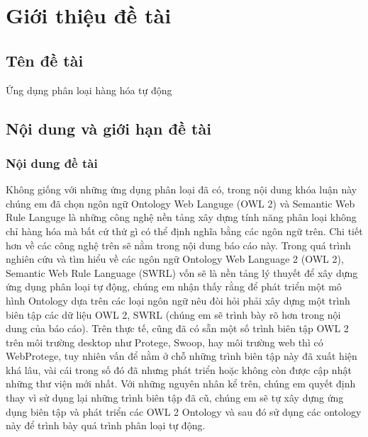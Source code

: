 
\chapter {Giới thiệu đề tài}
\section{Tên đề tài}
Ứng dụng phân loại hàng hóa tự động
\section{Nội dung và giới hạn đề tài}
\subsection{Nội dung đề tài}
Không giống với những ứng dụng phân loại đã có, trong nội dung khóa luận này chúng em đã chọn ngôn ngữ Ontology Web Languge (OWL 2) và Semantic Web Rule Languge là những công nghệ nền tảng xây dựng tính năng phân loại không chỉ hàng hóa mà bất cứ thứ gì có thể định nghĩa bằng các ngôn ngữ trên. Chi tiết hơn về các công nghệ trên sẽ nằm trong nội dung báo cáo này. 
Trong quá trình nghiên cứu và tìm hiểu về các ngôn ngữ Ontology Web Language 2 (OWL 2), Semantic Web Rule Language (SWRL) vốn sẽ là nền tảng lý thuyết để xây dựng ứng dụng phân loại tự động, chúng em nhận thấy rằng để phát triển một mô hình Ontology dựa trên các loại ngôn ngữ nêu đòi hỏi phải xây dựng một trình biên tập các dữ liệu OWL 2, SWRL (chúng em sẽ trình bày rõ hơn trong nội dung của báo cáo). Trên thực tế, cũng đã có sẵn một số trình biên tập OWL 2 trên môi trường desktop như Protege, Swoop, hay môi trường web thì có WebProtege, tuy nhiên vấn để nằm ở chỗ những trình biên tập này đã xuất hiện khá lâu, vài cái trong số đó đã nhưng phát triển hoặc không còn được cập nhật những thư viện mới nhất.  Với những nguyên nhân kể trên, chúng em quyết định thay vì sử dụng lại những trình biên tập đã cũ, chúng em sẽ tự xây dựng ứng dụng biên tập và phát triển các OWL 2 Ontology và sau đó sử dụng các ontology này để trình bày quá trình phân loại tự động.
